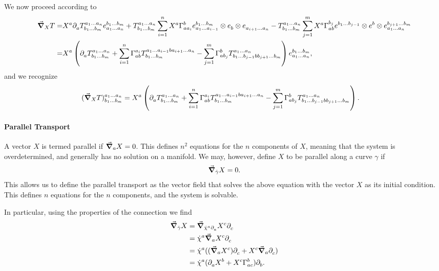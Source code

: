 We now proceed according to
\begin{align*}
	\dcov{X}{T} =& X^{a}\del{a}{\tensor*{T}{^{a_{1}\dots a_{n}}_{b_{1}\dots b_{m}}}}\tensor*{e}{^{b_{1}\dots b_{m}}_{a_{1}\dots a_{n}}} + \tensor*{T}{^{a_{1}\dots a_{n}}_{b_{1}\dots b_{m}}}\sum\limits_{i = 1}^{n}X^{a}\chris{b}{a}{a_{i}}\tensor*{e}{^{b_{1}\dots b_{m}}_{a_{1}\dots a_{i - 1}}}\otimes\tensor*{e}{_{b}}\otimes\tensor*{e}{_{a_{i + 1}\dots a_{n}}} - \tensor*{T}{^{a_{1}\dots a_{n}}_{b_{1}\dots b_{m}}}\sum\limits_{j = 1}^{m}X^{a}\chris{b_{j}}{a}{b}\tensor*{e}{^{b_{1}\dots b_{j - 1}}}\otimes\tensor*{e}{^{b}}\otimes\tensor*{e}{^{b_{j + 1}\dots b_{m}}_{a_{1}\dots a_{n}}} \\
	            =& X^{a}\left(\del{a}{\tensor*{T}{^{a_{1}\dots a_{n}}_{b_{1}\dots b_{m}}}} + \sum\limits_{i = 1}^{n}\chris{a_{i}}{a}{b}\tensor*{T}{^{a_{1}\dots a_{i - 1}ba_{i + 1}\dots a_{n}}_{b_{1}\dots b_{m}}} - \sum\limits_{j = 1}^{m}\chris{b}{a}{b_{j}}\tensor*{T}{^{a_{1}\dots a_{n}}_{b_{1}\dots b_{j - 1}bb_{j + 1}\dots b_{m}}}\right)\tensor*{e}{^{b_{1}\dots b_{m}}_{a_{1}\dots a_{n}}},
\end{align*}
and we recognize
\begin{align*}
	\tensor*{(\dcov{X}{T})}{^{a_{1}\dots a_{n}}_{b_{1}\dots b_{m}}} &= X^{a}\left(\del{a}{\tensor*{T}{^{a_{1}\dots a_{n}}_{b_{1}\dots b_{m}}}} + \sum\limits_{i = 1}^{n}\chris{a_{i}}{a}{b}\tensor*{T}{^{a_{1}\dots a_{i - 1}ba_{i + 1}\dots a_{n}}_{b_{1}\dots b_{m}}} - \sum\limits_{j = 1}^{m}\chris{b}{a}{b_{j}}\tensor*{T}{^{a_{1}\dots a_{n}}_{b_{1}\dots b_{j - 1}bb_{j + 1}\dots b_{m}}}\right).
\end{align*}

\paragraph{Parallel Transport}
A vector $X$ is termed parallel if $\grad_{a}{X} = 0$. This defines $n^{2}$ equations for the $n$ components of $X$, meaning that the system is overdetermined, and generally has no solution on a manifold. We may, however, define $X$ to be parallel along a curve $\gamma$ if
\begin{align*}
	\grad_{\dot{\gamma}}{X} = 0.
\end{align*}
This allows us to define the parallel transport as the vector field that solves the above equation with the vector $X$ as its initial condition. This defines $n$ equations for the $n$ components, and the system is solvable.

In particular, using the properties of the connection we find
\begin{align*}
	\dcov{\dot{\gamma}}{X} &= \dcov{\dot{\chi}^{a}\del{a}{}}{X^{c}\del{c}{}} \\
	                       &= \dot{\chi}^{a}\dcov{a}{X^{c}\del{c}{}} \\
	                       &= \dot{\chi}^{a}((\dcov{a}{X^{c}})\del{c}{} + X^{c}\dcov{a}{\del{c}{}}) \\
	                       &= \dot{\chi}^{a}(\del{a}{X^{b}} + X^{c}\chris{b}{a}{c})\del{b}{}.
\end{align*}

